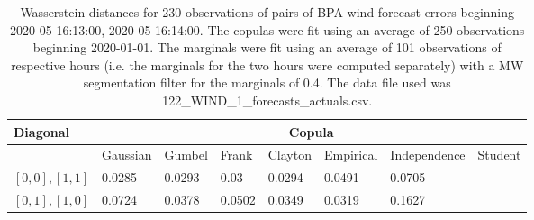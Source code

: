 \begin{table}[h] 
    \centering 
    \begin{tabular}{|l|l|l|l|l|l|l|l|} \hline 
        \textbf{Diagonal} & \multicolumn{7}{c|}{\textbf{Copula}} \\ \hline 
        & Gaussian & Gumbel & Frank & Clayton & Empirical & Independence & Student \\ \hline 
        $[0,0], [1,1]$ & 0.0285 & 0.0293 & 0.03 & 0.0294 & 0.0491 & 0.0705 &  \\ \hline 
        $[0,1], [1,0]$ & 0.0724 & 0.0378 & 0.0502 & 0.0349 & 0.0319 & 0.1627 &  \\ \hline 
    \end{tabular} 
    \caption{Wasserstein distances for 230 observations of pairs of BPA wind forecast errors beginning 2020-05-16:13:00, 2020-05-16:14:00. The copulas were fit  using an average of 250 observations beginning 2020-01-01. The marginals were fit using an average of 101 observations of respective hours (i.e. the  marginals for the two hours were computed separately) with a MW segmentation filter for the marginals of 0.4. The data file used was 122\_WIND\_1\_forecasts\_actuals.csv.} 
\end{table}